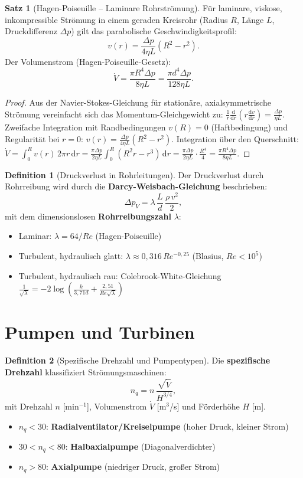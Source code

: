 ﻿\documentclass[a4paper,12pt]{report}
\theoremstyle{definition}
\newtheorem{definition}{Definition}
\newtheorem{satz}{Satz}
\begin{document}
\begin{satz}[Hagen-Poiseuille -- Laminare Rohrstr\"omung]
F\"ur laminare, viskose, inkompressible Str\"omung in einem geraden Kreisrohr
(Radius $R$, L\"ange $L$, Druckdifferenz $\Delta p$) gilt das parabolische
Geschwindigkeitsprofil:
\[
  v(r) = \frac{\Delta p}{4\eta L}(R^2 - r^2).
\]
Der Volumenstrom (Hagen-Poiseuille-Gesetz):
\[
  \dot{V} = \frac{\pi R^4 \Delta p}{8\eta L} = \frac{\pi d^4 \Delta p}{128\eta L}.
\]
\end{satz}
\begin{proof}
Aus der Navier-Stokes-Gleichung f\"ur station\"are, axialsymmetrische
Str\"omung vereinfacht sich das Momentum-Gleichgewicht zu:
$\frac{1}{r}\frac{\mathrm{d}}{\mathrm{d}r}\left(r\frac{\mathrm{d}v}{\mathrm{d}r}\right) = \frac{\Delta p}{\eta L}$.
Zweifache Integration mit Randbedingungen $v(R) = 0$ (Haftbedingung)
und Regularit\"at bei $r = 0$: $v(r) = \frac{\Delta p}{4\eta L}(R^2 - r^2)$.
Integration \"uber den Querschnitt: $\dot{V} = \int_0^R v(r)\,2\pi r\,\mathrm{d}r
= \frac{\pi\Delta p}{2\eta L}\int_0^R (R^2r - r^3)\,\mathrm{d}r
= \frac{\pi\Delta p}{2\eta L}\cdot\frac{R^4}{4} = \frac{\pi R^4\Delta p}{8\eta L}$.
\end{proof}

\begin{definition}[Druckverlust in Rohrleitungen]
Der Druckverlust durch Rohrreibung wird durch die \textbf{Darcy-Weisbach-Gleichung}
beschrieben:
\[
  \Delta p_V = \lambda\,\frac{L}{d}\,\frac{\rho\,v^2}{2},
\]
mit dem dimensionslosen \textbf{Rohrreibungszahl} $\lambda$:
\begin{itemize}
    \item[-] Laminar: $\lambda = 64/Re$ (Hagen-Poiseuille)
    \item[-] Turbulent, hydraulisch glatt: $\lambda \approx 0{,}316\,Re^{-0{,}25}$ (Blasius, $Re < 10^5$)
    \item[-] Turbulent, hydraulisch rau: Colebrook-White-Gleichung
          $\frac{1}{\sqrt{\lambda}} = -2\log\left(\frac{k}{3{,}71d} + \frac{2{,}51}{Re\sqrt{\lambda}}\right)$
\end{itemize}
\end{definition}

\section{Pumpen und Turbinen}

\begin{definition}[Spezifische Drehzahl und Pumpentypen]
Die \textbf{spezifische Drehzahl} klassifiziert Str\"omungsmaschinen:
\[
  n_q = n\,\frac{\sqrt{\dot{V}}}{H^{3/4}},
\]
mit Drehzahl $n$ [min$^{-1}$], Volumenstrom $\dot{V}$ [m$^3$/s] und F\"orderh\"ohe $H$ [m].
\begin{itemize}
    \item[-] $n_q < 30$: \textbf{Radialventilator/Kreiselpumpe} (hoher Druck, kleiner Strom)
    \item[-] $30 < n_q < 80$: \textbf{Halbaxialpumpe} (Diagonalverdichter)
    \item[-] $n_q > 80$: \textbf{Axialpumpe} (niedriger Druck, gro\ss{}er Strom)
\end{itemize}
\end{definition}
\end{document}
